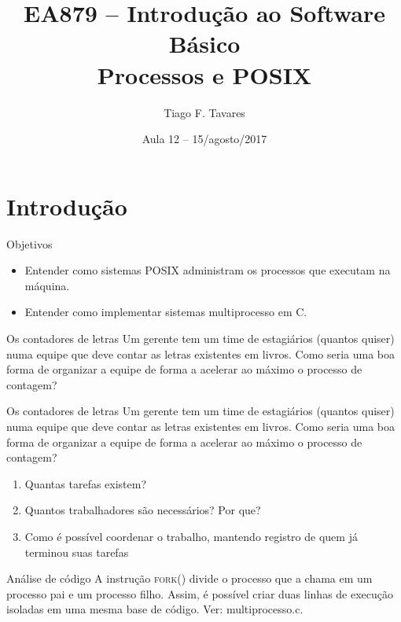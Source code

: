 \documentclass{beamer}
\title[12-posix-e-processos]{EA879 -- Introdução ao Software
Básico\\Processos e POSIX}
\author{Tiago F. Tavares}
\institute{FEEC -- UNICAMP}
\date{Aula 12 -- 15/agosto/2017}
\begin{document}
\begin{frame}
  \titlepage
\end{frame}


\section{Introdução}

\begin{frame}{Objetivos}
  \Large
  \begin{itemize}
    \item Entender como sistemas POSIX administram os processos que executam na
      máquina.
    \item Entender como implementar sistemas multiprocesso em C.
  \end{itemize}
\end{frame}


\begin{frame}[fragile]{Os contadores de letras}
  \centering
  \Large
  Um gerente tem um time de estagiários (quantos quiser)
  numa equipe que deve contar as letras existentes em livros. Como seria uma boa
  forma de organizar a equipe de forma a acelerar ao máximo o processo de
  contagem?
\end{frame}

\begin{frame}[fragile]{Os contadores de letras}
  \centering
  \large
  Um gerente tem um time de estagiários (quantos quiser)
  numa equipe que deve contar as letras existentes em livros. Como seria uma boa
  forma de organizar a equipe de forma a acelerar ao máximo o processo de
  contagem?

  \begin{enumerate}
    \item Quantas tarefas existem?
    \item Quantos trabalhadores são necessários? Por que?
    \item Como é possível coordenar o trabalho, mantendo registro de quem já
      terminou suas tarefas
  \end{enumerate}
\end{frame}

\begin{frame}[fragile]{Análise de código}
  \centering
  \large
  A instrução \textsc{fork()} divide o processo que a chama em um processo pai e
  um processo filho. Assim, é possível criar duas linhas de execução isoladas
  em uma mesma base de código. Ver: multiprocesso.c.
\end{frame}
\end{document}
